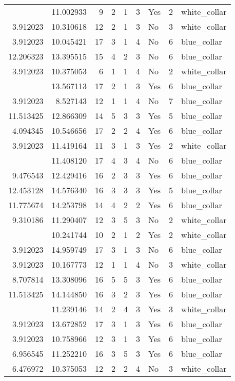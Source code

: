 \documentclass[
]{article}
\begin{document}
\begin{longtable}[t]{rrrrrllrl}
\addlinespace
3.912023 & 11.002933 & 9 & 2 & 1 & 3 & Yes & 2 & white\_collar\\
3.912023 & 10.310618 & 12 & 2 & 1 & 3 & No & 3 & white\_collar\\
3.912023 & 10.045421 & 17 & 3 & 1 & 4 & No & 6 & blue\_collar\\
12.206323 & 13.395515 & 15 & 4 & 2 & 3 & No & 6 & blue\_collar\\
3.912023 & 10.375053 & 6 & 1 & 1 & 4 & No & 2 & white\_collar\\
\addlinespace
3.912023 & 13.567113 & 17 & 2 & 1 & 3 & Yes & 6 & blue\_collar\\
3.912023 & 8.527143 & 12 & 1 & 1 & 4 & No & 7 & blue\_collar\\
11.513425 & 12.866309 & 14 & 5 & 3 & 3 & Yes & 5 & blue\_collar\\
4.094345 & 10.546656 & 17 & 2 & 2 & 4 & Yes & 6 & blue\_collar\\
3.912023 & 11.419164 & 11 & 3 & 1 & 3 & Yes & 2 & white\_collar\\
\addlinespace
9.215328 & 11.408120 & 17 & 4 & 3 & 4 & No & 6 & blue\_collar\\
9.476543 & 12.429416 & 16 & 2 & 3 & 3 & Yes & 6 & blue\_collar\\
12.453128 & 14.576340 & 16 & 3 & 3 & 3 & Yes & 5 & blue\_collar\\
11.775674 & 14.253798 & 14 & 4 & 2 & 2 & Yes & 6 & blue\_collar\\
9.310186 & 11.290407 & 12 & 3 & 5 & 3 & No & 2 & white\_collar\\
\addlinespace
3.912023 & 10.241744 & 10 & 2 & 1 & 2 & Yes & 2 & white\_collar\\
3.912023 & 14.959749 & 17 & 3 & 1 & 3 & No & 6 & blue\_collar\\
3.912023 & 10.167773 & 12 & 1 & 1 & 4 & No & 3 & white\_collar\\
8.707814 & 13.308096 & 16 & 5 & 5 & 3 & Yes & 6 & blue\_collar\\
11.513425 & 14.144850 & 16 & 3 & 2 & 3 & Yes & 6 & blue\_collar\\
\addlinespace
4.382027 & 11.239146 & 14 & 2 & 4 & 3 & Yes & 3 & white\_collar\\
3.912023 & 13.672852 & 17 & 3 & 1 & 3 & Yes & 6 & blue\_collar\\
3.912023 & 10.758966 & 12 & 3 & 1 & 3 & Yes & 6 & blue\_collar\\
6.956545 & 11.252210 & 16 & 3 & 5 & 3 & Yes & 6 & blue\_collar\\
6.476972 & 10.375053 & 12 & 2 & 2 & 4 & No & 3 & white\_collar\\

\end{longtable}
\end{document}
